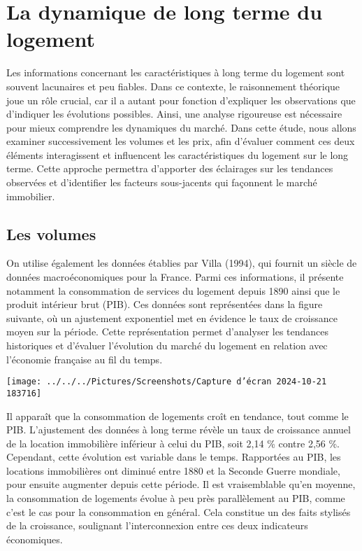 \documentclass[a4paper, 12pt]{report}
\begin{document}
\section{La dynamique de long terme du logement}

Les informations concernant les caractéristiques à long terme du logement sont souvent lacunaires et peu fiables. Dans ce contexte, le raisonnement théorique joue un rôle crucial, car il a autant pour fonction d'expliquer les observations que d'indiquer les évolutions possibles. Ainsi, une analyse rigoureuse est nécessaire pour mieux comprendre les dynamiques du marché. Dans cette étude, nous allons examiner successivement les volumes et les prix, afin d'évaluer comment ces deux éléments interagissent et influencent les caractéristiques du logement sur le long terme. Cette approche permettra d'apporter des éclairages sur les tendances observées et d'identifier les facteurs sous-jacents qui façonnent le marché immobilier.

\subsection{Les volumes}

On utilise également les données établies par Villa (1994), qui fournit un siècle de données macroéconomiques pour la France. Parmi ces informations, il présente notamment la consommation de services du logement depuis 1890 ainsi que le produit intérieur brut (PIB). Ces données sont représentées dans la figure suivante, où un ajustement exponentiel met en évidence le taux de croissance moyen sur la période. Cette représentation permet d'analyser les tendances historiques et d'évaluer l'évolution du marché du logement en relation avec l'économie française au fil du temps.

\begin{center}
	\texttt{[image: ../../../Pictures/Screenshots/Capture d'écran 2024-10-21 183716]}
\end{center}

Il apparaît que la consommation de logements croît en tendance, tout comme le PIB. L'ajustement des données à long terme révèle un taux de croissance annuel de la location immobilière inférieur à celui du PIB, soit 2,14 \% contre 2,56 \%. Cependant, cette évolution est variable dans le temps. Rapportées au PIB, les locations immobilières ont diminué entre 1880 et la Seconde Guerre mondiale, pour ensuite augmenter depuis cette période. Il est vraisemblable qu'en moyenne, la consommation de logements évolue à peu près parallèlement au PIB, comme c'est le cas pour la consommation en général. Cela constitue un des faits stylisés de la croissance, soulignant l'interconnexion entre ces deux indicateurs économiques.
\end{document}
